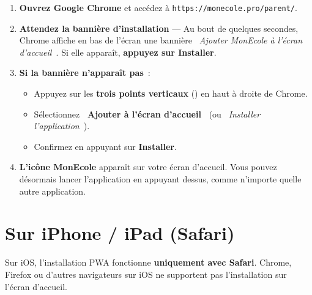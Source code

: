 \documentclass[12pt,a4paper]{report}
\begin{document}
\begin{etape}[title=Proc\'edure : Installation sur Android]
\begin{enumerate}[leftmargin=1.5cm,label=\textbf{\arabic*.},itemsep=12pt]
  \item \textbf{Ouvrez Google Chrome} et acc\'edez \`a \texttt{https://monecole.pro/parent/}.

  \item \textbf{Attendez la banni\`ere d'installation} --- Au bout de quelques secondes, Chrome affiche en bas de l'\'ecran une banni\`ere \textit{\guillemotleft~Ajouter MonEcole \`a l'\'ecran d'accueil~\guillemotright}. Si elle appara\^it, \textbf{appuyez sur Installer}.

  \item \textbf{Si la banni\`ere n'appara\^it pas}~:
  \begin{itemize}
    \item Appuyez sur les \textbf{trois points verticaux} (\faEllipsisV) en haut \`a droite de Chrome.
    \item S\'electionnez \textbf{\guillemotleft~Ajouter \`a l'\'ecran d'accueil~\guillemotright} (ou \textit{\guillemotleft~Installer l'application~\guillemotright}).
    \item Confirmez en appuyant sur \textbf{Installer}.
  \end{itemize}

  \item \textbf{L'ic\^one MonEcole} appara\^it sur votre \'ecran d'accueil. Vous pouvez d\'esormais lancer l'application en appuyant dessus, comme n'importe quelle autre application.
\end{enumerate}
\end{etape}

\section{Sur iPhone / iPad (Safari)}

\begin{danger}
Sur iOS, l'installation PWA fonctionne \textbf{uniquement avec Safari}. Chrome, Firefox ou d'autres navigateurs sur iOS ne supportent pas l'installation sur l'\'ecran d'accueil.
\end{danger}
\end{document}
